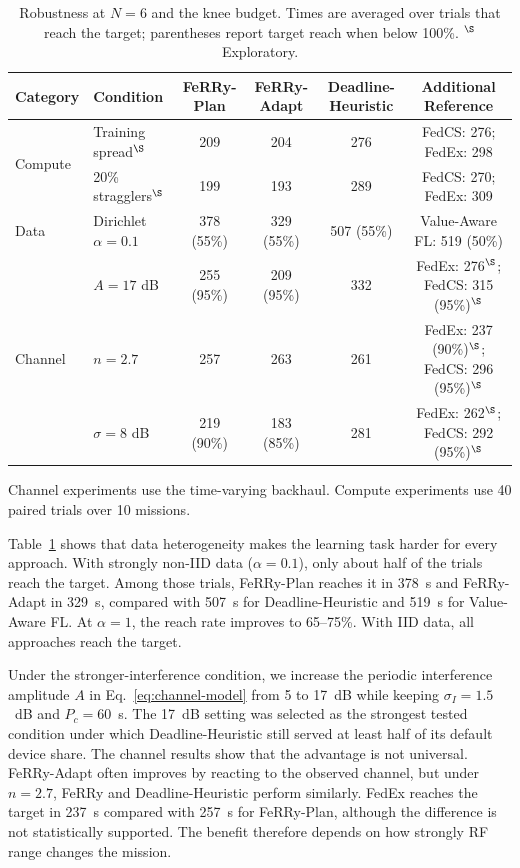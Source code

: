 \documentclass[conference]{IEEEtran}
\newcommand{\sysname}{FeRRy}
\begin{document}
\begin{table}[t]
\centering
\caption{Robustness at \(N=6\) and the knee budget. Times are averaged over
trials that reach the target; parentheses report target reach when below
100\%. \(^{\S}\) Exploratory.}
\label{tab:robustness}
\small
\setlength{\tabcolsep}{5pt}

\begin{tabular}{llcccc}
\hline
\textbf{Category} &
\textbf{Condition} &
\textbf{\sysname{}-Plan} &
\textbf{\sysname{}-Adapt} &
\textbf{Deadline-Heuristic} &
\textbf{Additional Reference} \\
\hline

\multirow{2}{*}{Compute}
& Training spread$^{\S}$
& 209
& 204
& 276
& FedCS: 276; FedEx: 298 \\

& 20\% stragglers$^{\S}$
& 199
& 193
& 289
& FedCS: 270; FedEx: 309 \\
\hline

Data
& Dirichlet \(\alpha=0.1\)
& 378 (55\%)
& 329 (55\%)
& 507 (55\%)
& Value-Aware FL: 519 (50\%) \\
\hline

\multirow{3}{*}{Channel}
& \(A=17\) dB
& 255 (95\%)
& 209 (95\%)
& 332
& FedEx: 276$^{\S}$; FedCS: 315 (95\%)$^{\S}$ \\

& \(n=2.7\)
& 257
& 263
& 261
& FedEx: 237 (90\%)$^{\S}$; FedCS: 296 (95\%)$^{\S}$ \\

& \(\sigma=8\) dB
& 219 (90\%)
& 183 (85\%)
& 281
& FedEx: 262$^{\S}$; FedCS: 292 (95\%)$^{\S}$ \\
\hline
\end{tabular}

\vspace{2pt}
\footnotesize
Channel experiments use the time-varying backhaul. Compute experiments use
40 paired trials over 10 missions.
\end{table}

Table~\ref{tab:robustness} shows that data heterogeneity makes the learning task
harder for every approach. With strongly non-IID data
(\(\alpha=0.1\)), only about half of the trials reach the target. Among those
trials, \sysname{}-Plan reaches it in 378~s and \sysname{}-Adapt in 329~s,
compared with 507~s for Deadline-Heuristic and 519~s for Value-Aware FL.
At \(\alpha=1\), the reach rate improves to 65--75\%. With IID data, all
approaches reach the target.

Under the stronger-interference condition, we increase the periodic interference
amplitude \(A\) in Eq.~\eqref{eq:channel-model} from 5 to 17~dB while keeping
\(\sigma_I=1.5\)~dB and \(P_c=60\)~s. The 17~dB setting was selected as the
strongest tested condition under which Deadline-Heuristic still served at
least half of its default device share. The channel results show that the
advantage is not universal. \sysname{}-Adapt often improves by reacting to the
observed channel, but under \(n=2.7\), \sysname{} and Deadline-Heuristic
perform similarly. FedEx reaches the target in 237~s compared with 257~s for
\sysname{}-Plan, although the difference is not statistically supported. The
benefit therefore depends on how strongly RF range changes the mission.
\end{document}
